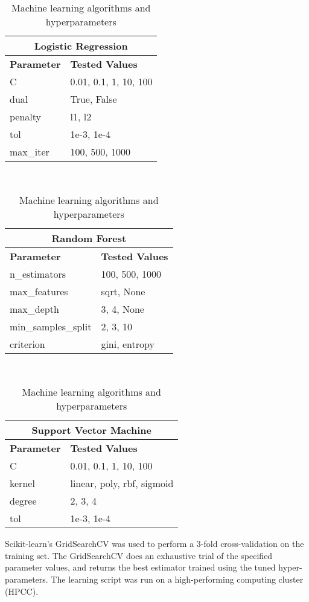 \documentclass[letterpaper, 10 pt, conference]{ieeeconf}
\begin{document}
\begin{table}[h]
\caption{Machine learning algorithms and hyperparameters}
\centering
\begin{tabular}{@{}ll@{}}
\multicolumn{2}{c}{\textbf{Logistic Regression}} \\ \toprule
\textbf{Parameter}     & \textbf{Tested Values}     \\ \midrule
C & 0.01, 0.1, 1, 10, 100\\
dual & True, False\\
penalty & l1, l2\\
tol & 1e-3, 1e-4\\
max\_iter & 100, 500, 1000\\\bottomrule
\end{tabular}\\\medskip
\begin{tabular}{@{}ll@{}}
\multicolumn{2}{c}{\textbf{Random Forest}}                                       \\ \toprule
\textbf{Parameter} & \textbf{Tested Values} \\\midrule
n\_estimators & 100, 500, 1000\\
max\_features & sqrt, None\\
max\_depth & 3, 4, None\\
min\_samples\_split & 2, 3, 10\\
criterion & gini, entropy\\\bottomrule
\end{tabular}\\\medskip
\begin{tabular}{@{}ll@{}}
\multicolumn{2}{c}{\textbf{Support Vector Machine}}                                       \\ \toprule
\textbf{Parameter} & \textbf{Tested Values} \\\midrule
C & 0.01, 0.1, 1, 10, 100\\
kernel & linear, poly, rbf, sigmoid\\
degree & 2, 3, 4\\
tol & 1e-3, 1e-4\\\bottomrule
\end{tabular}
\end{table}

Scikit-learn's GridSearchCV was used to perform a 3-fold cross-validation on the training set. The GridSearchCV does an exhaustive trial of the specified parameter values, and returns the best estimator trained using the tuned hyper-parameters. The learning script was run on a high-performing computing cluster (HPCC).
\end{document}
